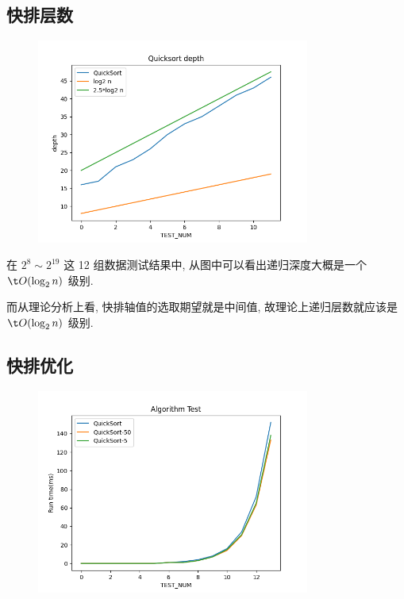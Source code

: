 \subsection{快排层数}

\begin{figure}[H]
	\centering
	\includegraphics[width=0.8\textwidth]{figures/quick_dep.png}
\end{figure}

在 $2^8\sim 2^{19}$ 这 12 组数据测试结果中, 从图中可以看出递归深度大概是一个 $\t O(\log_2 n)$ 级别.

而从理论分析上看, 快排轴值的选取期望就是中间值, 故理论上递归层数就应该是 $\t O(\log_2 n)$ 级别.

\subsection{快排优化}

\begin{figure}[H]
	\centering
	\includegraphics[width=0.8\textwidth]{figures/quick.png}
\end{figure}

